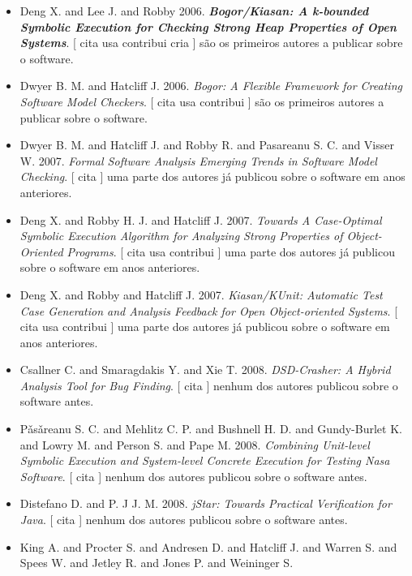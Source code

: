 \begin{itemize}
\item Deng X. and Lee J. and Robby
      2006.
        \textbf{\textit{ Bogor/Kiasan: A k-bounded Symbolic Execution for Checking Strong Heap Properties of Open Systems}}.
      [
          cita
          usa
          contribui
          cria
      ]
são os primeiros autores a publicar sobre o software.
\item Dwyer B. M. and Hatcliff J.
      2006.
        \textit{ Bogor: A Flexible Framework for Creating Software Model Checkers}.
      [
          cita
          usa
          contribui
      ]
são os primeiros autores a publicar sobre o software.
\item Dwyer B. M. and Hatcliff J. and Robby R. and Pasareanu S. C. and Visser W.
      2007.
        \textit{ Formal Software Analysis Emerging Trends in Software Model Checking}.
      [
          cita
      ]
uma parte dos autores já publicou sobre o software em anos anteriores.
\item Deng X. and Robby H. J. and Hatcliff J.
      2007.
        \textit{ Towards A Case-Optimal Symbolic Execution Algorithm for Analyzing Strong Properties of Object-Oriented Programs}.
      [
          cita
          usa
          contribui
      ]
uma parte dos autores já publicou sobre o software em anos anteriores.
\item Deng X. and Robby and Hatcliff J.
      2007.
        \textit{ Kiasan/KUnit: Automatic Test Case Generation and Analysis Feedback for Open Object-oriented Systems}.
      [
          cita
          usa
          contribui
      ]
uma parte dos autores já publicou sobre o software em anos anteriores.
\item Csallner C. and Smaragdakis Y. and Xie T.
      2008.
        \textit{ DSD-Crasher: A Hybrid Analysis Tool for Bug Finding}.
      [
          cita
      ]
nenhum dos autores publicou sobre o software antes.
\item P\v{a}s\v{a}reanu S. C. and Mehlitz C. P. and Bushnell H. D. and Gundy-Burlet K. and Lowry M. and Person S. and Pape M.
      2008.
        \textit{ Combining Unit-level Symbolic Execution and System-level Concrete Execution for Testing Nasa Software}.
      [
          cita
      ]
nenhum dos autores publicou sobre o software antes.
\item Distefano D. and P. J J. M.
      2008.
        \textit{ jStar: Towards Practical Verification for Java}.
      [
          cita
      ]
nenhum dos autores publicou sobre o software antes.
\item King A. and Procter S. and Andresen D. and Hatcliff J. and Warren S. and Spees W. and Jetley R. and Jones P. and Weininger S.

\end{itemize}
